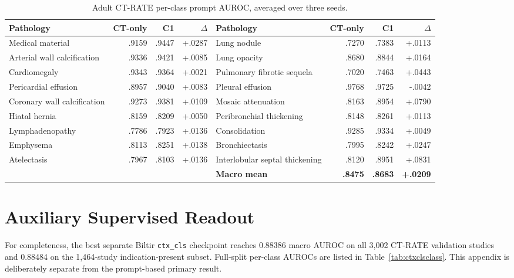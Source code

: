 \documentclass[10pt,twocolumn]{article}
\begin{document}
\begin{table}[t]
\centering
\caption{Adult CT-RATE per-class prompt AUROC, averaged over three seeds.}
\label{tab:adultclass}
\begin{tabular}{@{}lrrr@{\hspace{1.0cm}}lrrr@{}}
\toprule
Pathology & CT-only & C1 & $\Delta$ & Pathology & CT-only & C1 & $\Delta$ \\
\midrule
Medical material & .9159 & .9447 & +.0287 & Lung nodule & .7270 & .7383 & +.0113 \\
Arterial wall calcification & .9336 & .9421 & +.0085 & Lung opacity & .8680 & .8844 & +.0164 \\
Cardiomegaly & .9343 & .9364 & +.0021 & Pulmonary fibrotic sequela & .7020 & .7463 & +.0443 \\
Pericardial effusion & .8957 & .9040 & +.0083 & Pleural effusion & .9768 & .9725 & -.0042 \\
Coronary wall calcification & .9273 & .9381 & +.0109 & Mosaic attenuation & .8163 & .8954 & +.0790 \\
Hiatal hernia & .8159 & .8209 & +.0050 & Peribronchial thickening & .8148 & .8261 & +.0113 \\
Lymphadenopathy & .7786 & .7923 & +.0136 & Consolidation & .9285 & .9334 & +.0049 \\
Emphysema & .8113 & .8251 & +.0138 & Bronchiectasis & .7995 & .8242 & +.0247 \\
Atelectasis & .7967 & .8103 & +.0136 & Interlobular septal thickening & .8120 & .8951 & +.0831 \\
\multicolumn{4}{c}{} & \textbf{Macro mean} & \textbf{.8475} & \textbf{.8683} & \textbf{+.0209} \\
\bottomrule
\end{tabular}
\end{table}

\section{Auxiliary Supervised Readout}
For completeness, the best separate Biltir \texttt{ctx\_cls} checkpoint reaches
0.88386 macro AUROC on all 3,002 CT-RATE validation studies and 0.88484 on the
1,464-study indication-present subset. Full-split per-class AUROCs are listed
in Table~\ref{tab:ctxclsclass}. This appendix is deliberately separate from the
prompt-based primary result.
\end{document}
